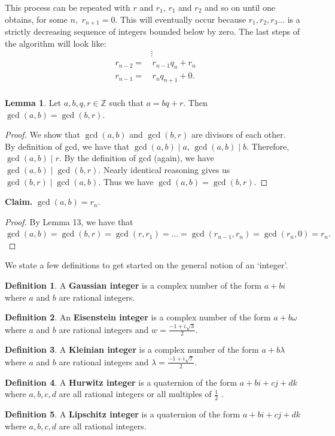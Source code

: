 \documentclass[11pt]{report}
\theoremstyle{plain}
\theoremstyle{definition}
\newtheorem{defn}{Definition}
\newtheorem{lemma}[theorem]{Lemma}
\begin{document}
This process can be repeated with $ r $ and $ r_1 $, $r_1$ and $ r_2 $ and so on until one obtains, for some $ n ,$ $ r_{n+1}=0 $. This will eventually occur because $ r_1, r_2, r_3 ... $ is a strictly decreasing sequence of integers bounded below by zero. The last steps of the algorithm will look like:
\begin{align*}
& \vdots \\
r_{n-2} =& \,r_{n-1} q_n + r_n \\
r_{n-1} =& \,r_n q_{n+1} + 0 . \\
\end{align*}

\begin{lemma}
	Let $ a, b, q ,r \in \mathbb{Z}$ such that $ a = bq + r. $ Then $ \gcd(a,b) = \gcd(b,r) $.
\end{lemma}
\begin{proof}
	We show that $ \gcd(a,b) $ and $ \gcd(b,r)$ are divisors of each other.\\
	By definition of gcd, we have that $ \gcd(a,b) \mid a,\,  \gcd(a,b) \mid b$. Therefore, $ \gcd(a,b) \mid r.$ By the definition of gcd (again), we have $  \gcd(a,b) \mid  \gcd(b,r).  $ Nearly identical reasoning gives us $  \gcd(b,r) \mid  \gcd(a,b).  $ Thus we have $ \gcd(a,b) = \gcd(b,r) $.
\end{proof}
\textbf{Claim.} $ \gcd(a,b) = r_n .$ 
\begin{proof}
	  By Lemma 13, we have that $ \gcd(a,b) = \gcd(b,r) = \gcd(r,r_1) = ... = \gcd(r_{n-1},r_n) = \gcd(r_n,0) = r_n. $
\end{proof}
We state a few definitions to get started on the general notion of an `integer'. 
\begin{defn}
	A \textbf{Gaussian integer} is a complex number of the form $ a + bi $ where $ a $ and $ b $ are rational integers. 
\end{defn}
\begin{defn}
	An \textbf{Eisenstein integer} is a complex number of the form $ a + b \omega $ where $ a $ and $ b $ are rational integers and $ w  = \frac{-1 + i \sqrt{3}}{2}$.  
\end{defn}
\begin{defn}
	A \textbf{Kleinian integer} is a complex number of the form $ a + b\lambda $ where $ a $ and $ b $ are rational integers and $ \lambda = \frac{-1+i\sqrt{7}}{2}$.
\end{defn}
\begin{defn}
	A \textbf{Hurwitz integer} is a quaternion of the form $ a + bi + cj + dk $ where $ a,b,c,d $ are all rational integers or all multiples of $ \frac{1}{2} $ .
\end{defn}
\begin{defn}
	A \textbf{Lipschitz integer} is a quaternion of the form $ a + bi + cj + dk $ where $ a,b,c,d $ are all rational integers.
\end{defn}
\end{document}
